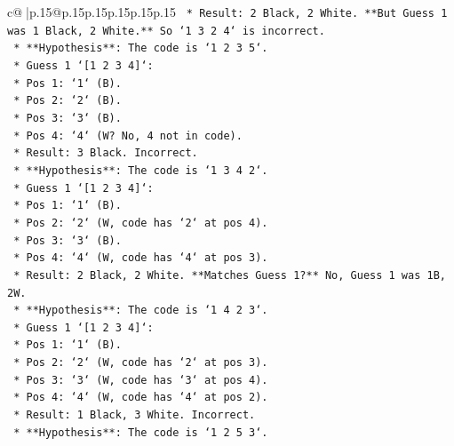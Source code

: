 \documentclass{article}
\begin{document}
{\begin{supertabular}{c@{$\;$}|p{.15\linewidth}@{}p{.15\linewidth}p{.15\linewidth}p{.15\linewidth}p{.15\linewidth}p{.15\linewidth}}
{{{\texttt{                            *   Result: 2 Black, 2 White. **But Guess 1 was 1 Black, 2 White.** So `1 3 2 4` is incorrect.} \\
\texttt{                    *   **Hypothesis**: The code is `1 2 3 5`.} \\
\texttt{                        *   Guess 1 `{[}1 2 3 4{]}`:} \\
\texttt{                            *   Pos 1: `1` (B).} \\
\texttt{                            *   Pos 2: `2` (B).} \\
\texttt{                            *   Pos 3: `3` (B).} \\
\texttt{                            *   Pos 4: `4` (W? No, 4 not in code).} \\
\texttt{                            *   Result: 3 Black. Incorrect.} \\
\texttt{                    *   **Hypothesis**: The code is `1 3 4 2`.} \\
\texttt{                        *   Guess 1 `{[}1 2 3 4{]}`:} \\
\texttt{                            *   Pos 1: `1` (B).} \\
\texttt{                            *   Pos 2: `2` (W, code has `2` at pos 4).} \\
\texttt{                            *   Pos 3: `3` (B).} \\
\texttt{                            *   Pos 4: `4` (W, code has `4` at pos 3).} \\
\texttt{                            *   Result: 2 Black, 2 White. **Matches Guess 1?** No, Guess 1 was 1B, 2W.} \\
\texttt{                    *   **Hypothesis**: The code is `1 4 2 3`.} \\
\texttt{                        *   Guess 1 `{[}1 2 3 4{]}`:} \\
\texttt{                            *   Pos 1: `1` (B).} \\
\texttt{                            *   Pos 2: `2` (W, code has `2` at pos 3).} \\
\texttt{                            *   Pos 3: `3` (W, code has `3` at pos 4).} \\
\texttt{                            *   Pos 4: `4` (W, code has `4` at pos 2).} \\
\texttt{                            *   Result: 1 Black, 3 White. Incorrect.} \\
\texttt{                    *   **Hypothesis**: The code is `1 2 5 3`.} \\
}}}
\end{supertabular}}
\end{document}
